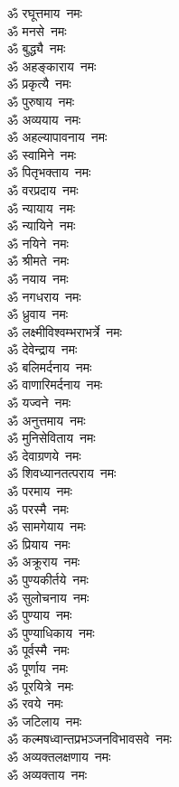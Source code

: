 \begin{multicols}{2}
\begin{flushleft}
ॐ रघूत्तमाय~नमः\\
ॐ मनसे~नमः\\
ॐ बुद्ध्यै~नमः\\
ॐ अहङ्काराय~नमः\\
ॐ प्रकृत्यै~नमः\\
ॐ पुरुषाय~नमः\\
ॐ अव्ययाय~नमः\\
ॐ अहल्यापावनाय~नमः\\
ॐ स्वामिने~नमः\hfill{}\\
ॐ पितृभक्ताय~नमः\\
ॐ वरप्रदाय~नमः\\
ॐ न्यायाय~नमः\\
ॐ न्यायिने~नमः\\
ॐ नयिने~नमः\\
ॐ श्रीमते~नमः\\
ॐ नयाय~नमः\\
ॐ नगधराय~नमः\\
ॐ ध्रुवाय~नमः\\
ॐ लक्ष्मीविश्वम्भराभर्त्रे~नमः\hfill{}\\
ॐ देवेन्द्राय~नमः\\
ॐ बलिमर्दनाय~नमः\\
ॐ वाणारिमर्दनाय~नमः\\
ॐ यज्वने~नमः\\
ॐ अनुत्तमाय~नमः\\
ॐ मुनिसेविताय~नमः\\
ॐ देवाग्रणये~नमः\\
ॐ शिवध्यानतत्पराय~नमः\\
ॐ परमाय~नमः\\
ॐ परस्मै~नमः\hfill{}\\
ॐ सामगेयाय~नमः\\
ॐ प्रियाय~नमः\\
ॐ अक्रूराय~नमः\\
ॐ पुण्यकीर्तये~नमः\\
ॐ सुलोचनाय~नमः\\
ॐ पुण्याय~नमः\\
ॐ पुण्याधिकाय~नमः\\
ॐ पूर्वस्मै~नमः\\
ॐ पूर्णाय~नमः\\
ॐ पूरयित्रे~नमः\hfill{}\\
ॐ रवये~नमः\\
ॐ जटिलाय~नमः\\
ॐ कल्मषध्वान्तप्रभञ्जन\-विभावसवे~नमः\\
ॐ अव्यक्तलक्षणाय~नमः\\
ॐ अव्यक्ताय~नमः\\

\end{flushleft}
\end{multicols}
